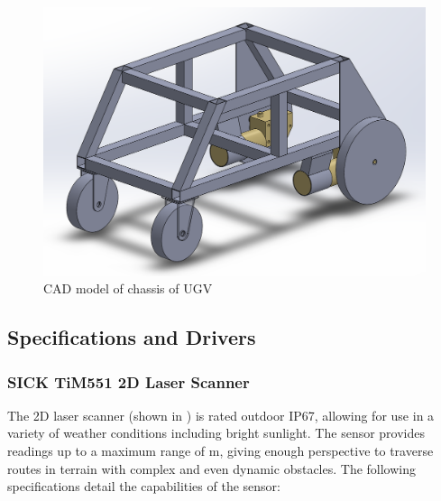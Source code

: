 \documentclass[titlepage,12pt,a4paper]{article}
\begin{document}
\begin{figure}[h!]
	\centering
	\includegraphics[scale=0.6]{figures/UGV.png}
	\caption{CAD model of chassis of UGV}
	\label{figure:ugv_chassis}
\end{figure}

\subsection{Specifications and Drivers}
\subsubsection{SICK TiM551 2D Laser Scanner}




The 2D laser scanner (shown in ) is rated outdoor IP67, allowing for use in a variety of weather conditions including bright sunlight. The sensor provides readings up to a maximum range of \unit[10]{m}, giving enough perspective to traverse routes in terrain with complex and even dynamic obstacles. The following specifications detail the capabilities of the sensor: 
\end{document}
